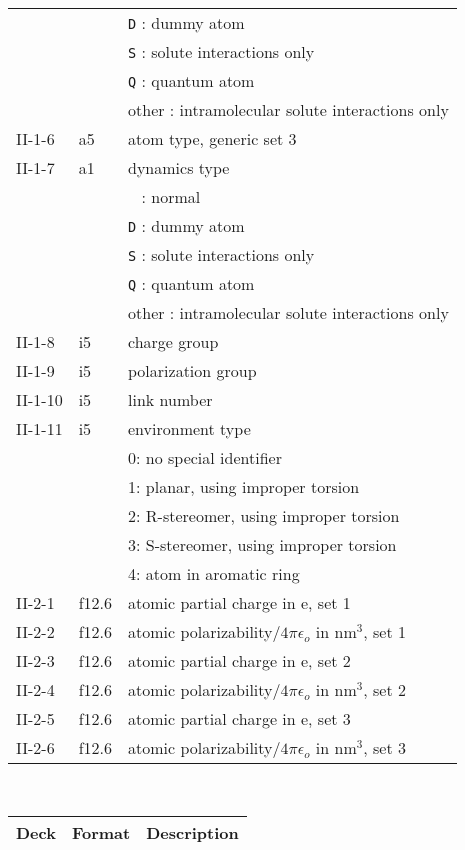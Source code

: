 \begin{center}
\begin{tabular*}{150mm}{p{12mm}p{12mm}l}
        &        & \verb+D+ : dummy atom\\
        &        & \verb+S+ : solute interactions only\\
        &        & \verb+Q+ : quantum atom\\
        &        & other : intramolecular solute interactions only\\
II-1-6  & a5     & atom type, generic set 3 \\
II-1-7  & a1     & dynamics type\\
        &        & \verb+ + : normal\\
        &        & \verb+D+ : dummy atom\\
        &        & \verb+S+ : solute interactions only\\
        &        & \verb+Q+ : quantum atom\\
        &        & other : intramolecular solute interactions only\\
II-1-8  & i5     & charge group\\
II-1-9  & i5     & polarization group\\
II-1-10 & i5     & link number\\
II-1-11 & i5     & environment type\\
        &        & 0: no special identifier\\
        &        & 1: planar, using improper torsion\\
        &        & 2: R-stereomer, using improper torsion\\
        &        & 3: S-stereomer, using improper torsion\\
        &        & 4: atom in aromatic ring\\
II-2-1  & f12.6  & atomic partial charge in e, set 1\\
II-2-2  & f12.6  & atomic polarizability/$4\pi\epsilon_o$ in nm$^3$, set 1\\
II-2-3  & f12.6  & atomic partial charge in e, set 2\\
II-2-4  & f12.6  & atomic polarizability/$4\pi\epsilon_o$ in nm$^3$, set 2\\
II-2-5  & f12.6  & atomic partial charge in e, set 3\\
II-2-6  & f12.6  & atomic polarizability/$4\pi\epsilon_o$ in nm$^3$, set 3\\
\hline
\end{tabular*}\\
\begin{tabular*}{150mm}{p{12mm}p{12mm}l}
\hline\hline
Deck & Format & Description \\ \hline

\end{tabular*}
\end{center}
